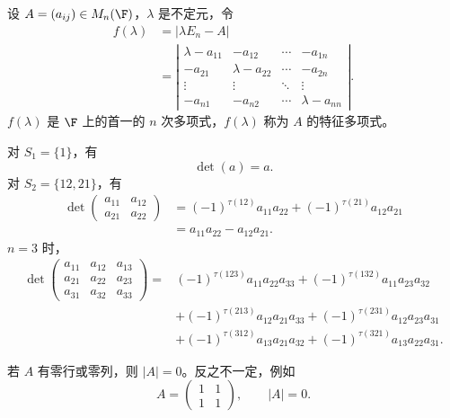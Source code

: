 \begin{example}
	设 $A=(a_{ij})\in M_n(\F)$，$\lambda$ 是不定元，令
	\[
	\begin{aligned}
		f(\lambda)
		&=|\lambda E_n-A|\\
		&=
		\left|
		\begin{matrix}
			\lambda-a_{11}&-a_{12}&\cdots&-a_{1n}\\
			-a_{21}&\lambda-a_{22}&\cdots&-a_{2n}\\
			\vdots&\vdots&\ddots&\vdots\\
			-a_{n1}&-a_{n2}&\cdots&\lambda-a_{nn}
		\end{matrix}
		\right|.
	\end{aligned}
	\]
	\label{p1:concept:c3-l1987}$f(\lambda)$ 是 $\F$ 上的首一的 $n$ 次多项式，$f(\lambda)$ 称为 $A$ 的特征多项式。
\end{example}

\begin{example}
	对 $S_1=\{1\}$，有
	\[
	\det(a)=a.
	\]
	对 $S_2=\{12,21\}$，有
	\[
	\begin{aligned}
		\det
		\begin{pmatrix}
			a_{11}&a_{12}\\
			a_{21}&a_{22}
		\end{pmatrix}
		&=(-1)^{\tau(12)}a_{11}a_{22}
		+(-1)^{\tau(21)}a_{12}a_{21}\\
		&=a_{11}a_{22}-a_{12}a_{21}.
	\end{aligned}
	\]
	$n=3$ 时，
	\[
	\begin{aligned}
		\det
		\begin{pmatrix}
			a_{11}&a_{12}&a_{13}\\
			a_{21}&a_{22}&a_{23}\\
			a_{31}&a_{32}&a_{33}
		\end{pmatrix}
		=&(-1)^{\tau(123)}a_{11}a_{22}a_{33}
		+(-1)^{\tau(132)}a_{11}a_{23}a_{32}\\
		&+(-1)^{\tau(213)}a_{12}a_{21}a_{33}
		+(-1)^{\tau(231)}a_{12}a_{23}a_{31}\\
		&+(-1)^{\tau(312)}a_{13}a_{21}a_{32}
		+(-1)^{\tau(321)}a_{13}a_{22}a_{31}.
	\end{aligned}
	\]
\end{example}


若 $A$ 有零行或零列，则 $|A|=0$。反之不一定，例如
\[
A=\begin{pmatrix}1&1\\1&1\end{pmatrix},
\qquad
|A|=0.
\]

